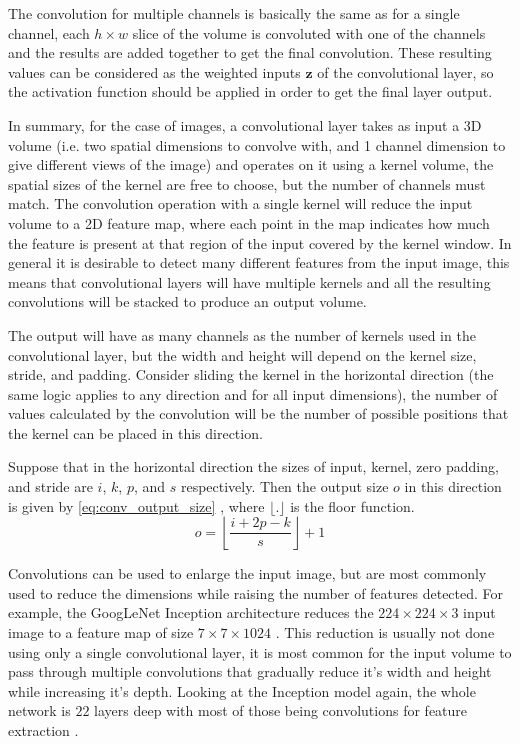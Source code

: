 The convolution for multiple channels is basically the same as for a single channel, each $h\times w$ slice of the volume is convoluted with one of the channels and the results are added together to get the final convolution. These resulting values can be considered as the weighted inputs $\bm{z}$ of the convolutional layer, so the activation function should be applied in order to get the final layer output.

In summary, for the case of images, a convolutional layer takes as input a 3D volume (i.e. two spatial dimensions to convolve with, and 1 channel dimension to give different views of the image) and operates on it using a kernel volume, the spatial sizes of the kernel are free to choose, but the number of channels must match. The convolution operation with a single kernel will reduce the input volume to a 2D feature map, where each point in the map indicates how much the feature is present at that region of the input covered by the kernel window. In general it is desirable to detect many different features from the input image, this means that convolutional layers will have multiple kernels and all the resulting convolutions will be stacked to produce an output volume.

The output will have as many channels as the number of kernels used in the convolutional layer, but the width and height will depend on the kernel size, stride, and padding. Consider sliding the kernel in the horizontal direction (the same logic applies to any direction and for all input dimensions), the number of values calculated by the convolution will be the number of possible positions that the kernel can be placed in this direction.

Suppose that in the horizontal direction the sizes of input, kernel, zero padding, and stride are $i$, $k$, $p$, and $s$ respectively. Then the output size $o$ in this direction is given by \autoref{eq:conv_output_size} \cite{guide_conv2018}, where $\lfloor{.}\rfloor$ is the floor function.
\begin{equation} \label{eq:conv_output_size}
    o = \left\lfloor{
        \frac{i + 2p - k}{s}
    }\right\rfloor + 1
\end{equation}

Convolutions can be used to enlarge the input image, but are most commonly used to reduce the dimensions while raising the number of features detected. For example, the GoogLeNet Inception architecture reduces the $224\times224\times3$ input image to a feature map of size $7\times7\times1024$ \cite{inceptionV1_2014}. This reduction is usually not done using only a single convolutional layer, it is most common for the input volume to pass through multiple convolutions that gradually reduce it's width and height while increasing it's depth. Looking at the Inception model again, the whole network is $22$ layers deep with most of those being convolutions for feature extraction \cite{inceptionV1_2014}.

